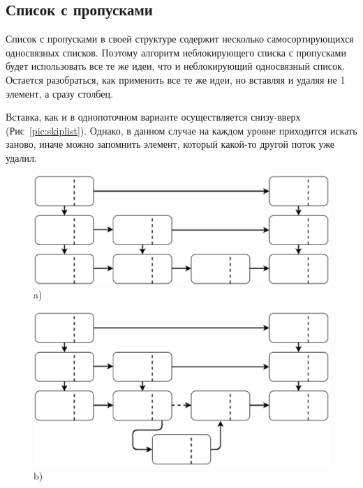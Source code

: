 \documentclass[12pt]{article}
\begin{document}
{			\subsection{Список с пропусками}
				\par Список с пропусками в своей структуре содержит несколько самосортирующихся односвязных списков. Поэтому алгоритм неблокирующего списка с пропусками будет использовать все те же идеи, что и неблокирующий односвязный список. Остается разобраться, как применить все те же идеи, но вставляя и удаляя не 1 элемент, а сразу столбец. 
				\par Вставка, как и в однопоточном варианте осуществляется снизу-вверх (Рис~\ref{pic:skiplist}). Однако, в данном случае на каждом уровне приходится искать заново, иначе можно запомнить элемент, который какой-то другой поток уже удалил.
				\begin{figure}[h!]
					\begin{minipage}[h]{0.45\linewidth}
						\center \includegraphics[width=1\linewidth]{12} a) \\
					\end{minipage}
					\hfill
					\begin{minipage}[h]{0.45\linewidth}
						\center \includegraphics[width=1\linewidth]{13} b) \\
					\end{minipage}
					\vfill
					\begin{minipage}[h]{0.60\linewidth}

\end{minipage}
\end{figure}}
\end{document}
